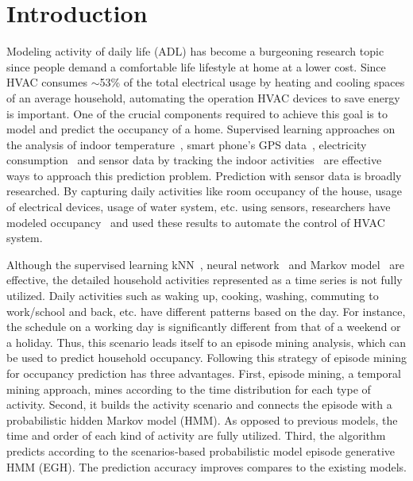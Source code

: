 \section{Introduction}

Modeling activity of daily life (ADL) has become a burgeoning research topic 
since people demand a comfortable life lifestyle at home
at a lower cost. 
Since HVAC consumes $\sim$53\% of the total electrical usage 
by heating and cooling spaces%
of an average household, 
automating the operation HVAC devices to save energy is important. 
One of the crucial components required to achieve this goal is 
to model and predict the occupancy of a home. 
Supervised learning approaches on the analysis of indoor temperature~\cite{kleiminger2014predicting}, 
smart phone's GPS data~\cite{koehler2013therml}, 
electricity consumption~\cite{erickson2010occupancy} and 
sensor data by tracking the indoor activities~\cite{scott2011preheat,alrazgan2011learning} 
are effective ways to approach this prediction problem. 
Prediction with sensor data is broadly researched. 
By capturing daily activities like room occupancy of the house, 
usage of electrical devices, 
usage of water system, etc. using sensors, 
researchers have modeled occupancy~\cite{mahmoud2013behavioural,erickson2010occupancy,beltran2014optimal} 
and used these results to automate the control of HVAC system. 

Although the supervised learning kNN~\cite{scott2011preheat}, 
neural network~\cite{mahmoud2013behavioural} and Markov model~\cite{erickson2010occupancy} 
are effective, 
the detailed household activities represented as a time series is not fully utilized. 
Daily activities such as waking up, cooking, washing, commuting to work/school and back, etc. 
have different patterns based on the day. 
For instance, the schedule on a working day is significantly different from that of a weekend 
or a holiday. 
Thus, this scenario leads itself to an episode mining analysis, 
which can be used to predict household occupancy. 
Following this strategy of episode mining for occupancy prediction has three advantages. 
First, episode mining, a temporal mining approach, mines according to the time 
distribution for each type of activity. 
Second, it builds the activity scenario and connects the episode with 
a probabilistic hidden Markov model (HMM). 
As opposed to previous models, 
the time and order of each kind of activity are fully utilized. 
Third, the algorithm predicts according to the scenarios-based probabilistic model episode 
generative HMM (EGH). The prediction accuracy improves compares to the existing models. 

